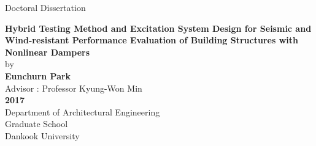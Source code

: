 \begin{titlepage}
\begin{flushright}
\vspace*{1.5cm}
\large{Doctoral Dissertation} \\
\end{flushright}
\begin{center}
\vspace*{1.0cm}
\noindent \Large{\textbf{Hybrid Testing Method and Excitation System Design for Seismic and Wind-resistant Performance Evaluation of Building Structures with Nonlinear Dampers}} \\
\vspace*{2.0cm}
\noindent \Large{by}\\
\vspace*{0.1cm}
\noindent \Large{\textbf{Eunchurn Park}}\\
\vspace*{0.1cm}
\noindent \Large{Advisor : Professor Kyung-Won Min} \\
\vspace*{2.0cm}
\noindent \Large \textbf{2017} \\
\vspace*{2.0cm}
\noindent \Large {Department of Architectural Engineering} \\
\vspace*{0.1cm}
\noindent \Large {Graduate School} \\
\vspace*{0.1cm}
\noindent \Large {Dankook University} \\
\end{center}
\end{titlepage}